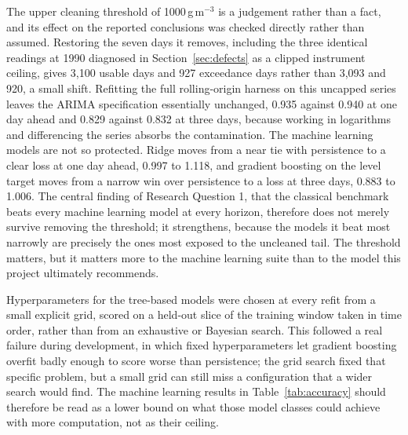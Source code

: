 \documentclass[12pt,a4paper]{report}
\begin{document}
The upper cleaning threshold of 1000\,\textmu g\,m$^{-3}$ is a judgement rather
than a fact, and its effect on the reported conclusions was checked directly
rather than assumed. Restoring the seven days it removes, including the three
identical readings at 1990 diagnosed in Section~\ref{sec:defects} as a clipped
instrument ceiling, gives 3{,}100 usable days and 927 exceedance days rather
than 3{,}093 and 920, a small shift. Refitting the full rolling-origin harness
on this uncapped series leaves the ARIMA specification essentially unchanged,
0.935 against 0.940 at one day ahead and 0.829 against 0.832 at three days,
because working in logarithms and differencing the series absorbs the
contamination. The machine learning models are not so protected. Ridge moves
from a near tie with persistence to a clear loss at one day ahead, 0.997 to
1.118, and gradient boosting on the level target moves from a narrow win over
persistence to a loss at three days, 0.883 to 1.006. The central finding of
Research Question 1, that the classical benchmark beats every machine learning
model at every horizon, therefore does not merely survive removing the
threshold; it strengthens, because the models it beat most narrowly are
precisely the ones most exposed to the uncleaned tail. The threshold matters,
but it matters more to the machine learning suite than to the model this
project ultimately recommends.

Hyperparameters for the tree-based models were chosen at every refit from a
small explicit grid, scored on a held-out slice of the training window taken
in time order, rather than from an exhaustive or Bayesian search. This
followed a real failure during development, in which fixed hyperparameters let
gradient boosting overfit badly enough to score worse than persistence; the
grid search fixed that specific problem, but a small grid can still miss a
configuration that a wider search would find. The machine learning results in
Table~\ref{tab:accuracy} should therefore be read as a lower bound on what
those model classes could achieve with more computation, not as their ceiling.
\end{document}
